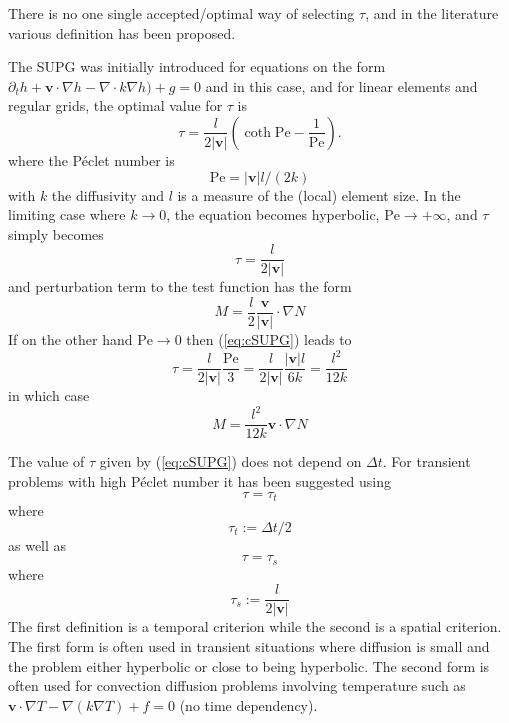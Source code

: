 \documentclass[10pt,a4paper]{book}
\newcommand{\p}{\partial}
\begin{document}
There is no one single accepted/optimal way of selecting $\tau$, and in
the literature various definition has been proposed.



The SUPG was initially introduced for equations on the form
$\p_t h + \bm{v} \cdot \nabla h- \nabla \cdot k \nabla h) +g=0$
and in this case, and for linear elements and regular grids, the
optimal value for $\tau$ is
\begin{equation}
\tau=\frac{ l }{2|\bm{v}|} \left ( \coth \mathrm{Pe} - \frac{1}{\mathrm{Pe}} \right ) .
\label{eq:cSUPG}
\end{equation}
where the P\'eclet number is
\[ 
\mathrm{Pe}=|\bm{v}| l/(2 k)
\]
with $k$ the diffusivity and $l$ is a measure of the (local)
element size. In the limiting case where $k \to 0$, the equation
becomes hyperbolic, $\mathrm{Pe}\to +\infty$, and $\tau$ simply
becomes
\[
\tau=\frac{ l }{2|\bm{v}|}
\]
and perturbation term to the test function has the form
\[
M=  \frac{l}{2} \frac{\bm{v}}{|\bm{v}|}  \cdot \nabla N 
\]
If on the other hand $\mathrm{Pe} \to 0 $ then (\ref{eq:cSUPG}) leads to 
\[
\tau=\frac{ l }{2|\bm{v}|} \frac{\mathrm{Pe}}{3} = \frac{ l }{2|\bm{v}|} \frac{|\bm{v}| l }{6 k} 
= \frac{ l^2 }{12 k} 
\]
in which case
\[
M=  \frac{l^2}{12 k} \bm{v}  \cdot \nabla N 
\]


The value of $\tau$ given by (\ref{eq:cSUPG}) does not depend on
$\Delta t$.  For transient problems with high P\'eclet number it has
been suggested using
\[
\tau=\tau_t
\]
where
\begin{equation}
 \tau_t := \Delta t /2  
\label{eq:tautemp}  
\end{equation}
as well as 
\[
\tau=\tau_s
\]
where
\begin{equation}
\tau_s := \frac{l}{2|\bm{v}|}
\label{eq:tauspacial}  
\end{equation}
The first definition is a temporal criterion while the second is a
spatial criterion.  The first form is often used in transient
situations where diffusion is small and the problem either hyperbolic
or close to being hyperbolic. The second form is often used for
convection diffusion problems involving temperature such as
$\bm{v} \cdot \nabla T- \nabla ( k \nabla T) +f=0$ (no time
dependency).
\end{document}

